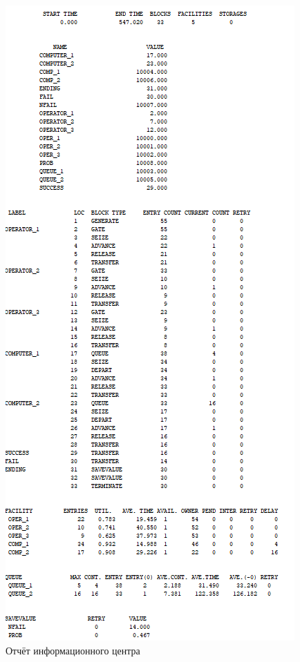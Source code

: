 \begin{figure}[h]
	\centering
	\includegraphics[height=0.96\textheight]{img/res.png}
	\caption{Отчёт информационного центра}
	\label{plt:even_comp_alg}
\end{figure}
